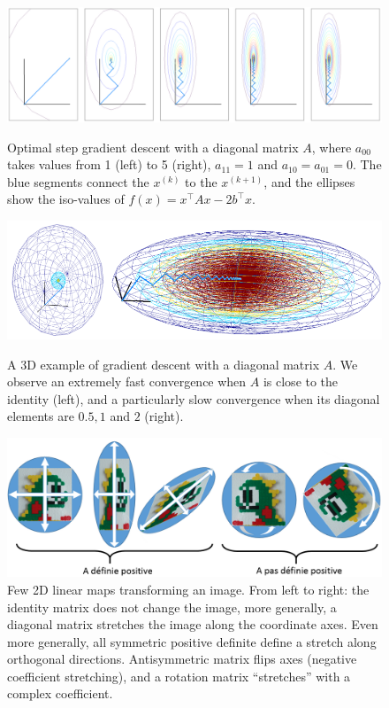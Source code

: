 \documentclass[notitlepage,oneside]{book}
\begin{document}
\begin{figure}[p]
  \centering
  \includegraphics[width=1\linewidth]{cg/gradient2Dconverge.png}
  \caption{
Optimal step gradient descent with a diagonal matrix $A$, where $a_{00}$ takes values from 1 (left) to 5 (right), $a_{11}=1$ and $a_{10}=a_{01}=0$.
The blue segments connect the $x^{(k)}$ to the $x^{(k+1)}$, and the ellipses show the iso-values of $f(x)=x^\top Ax-2b^\top x$.
}
  \label{fig:gradient2dconverge1}

  \includegraphics[width=1\linewidth]{cg/gradient3Dconverge1.png}
  \caption{
  A 3D example of gradient descent with a diagonal matrix $A$. We observe an extremely fast convergence when $A$ is close to the identity (left), 
  and a particularly slow convergence when its diagonal elements are $0.5,1$ and $2$ (right). }
  \label{fig:gradient3dconverge1}

  \includegraphics[width = \linewidth]{cg/defpositiveness.png}
  \caption{
Few 2D linear maps transforming an image.
From left to right: the identity matrix does not change the image, more generally, a diagonal matrix stretches the image along the coordinate axes.
Even more generally, all symmetric positive definite define a stretch along orthogonal directions.
Antisymmetric matrix flips axes (negative coefficient stretching),
and a rotation matrix  ``stretches'' with a complex coefficient.}
  \label{fig:eigenSPD}

\end{figure}
\end{document}
